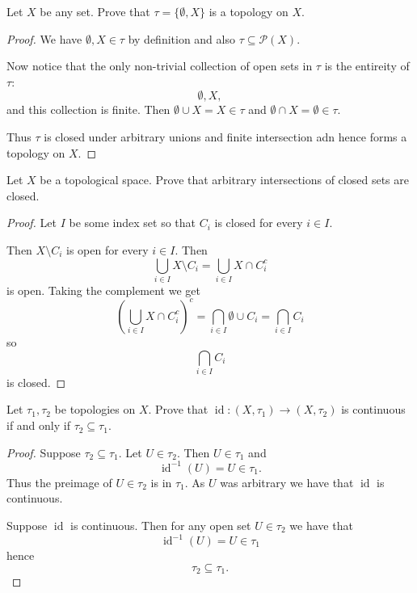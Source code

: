 \documentclass[11pt]{article}
\begin{document}
\begin{prob}
    Let $X$ be any set. Prove that $\tau = \{\emptyset, X\}$ 
    is a topology on $X$. 
\end{prob}
\begin{proof}
    We have $\emptyset, X \in \tau$ by definition and also 
    $\tau \subseteq \mathcal P(X)$. 

    Now notice that the only non-trivial collection 
    of open sets in $\tau$ is the entireity of 
    $\tau$: 
    \[
        \emptyset, X,
    \]
    and this collection is finite. 
    Then $\emptyset \cup X = X \in \tau$ and 
    $\emptyset \cap X = \emptyset \in \tau$. 

    Thus $\tau$ is closed under arbitrary unions 
    and finite intersection adn hence forms a topology 
    on $X$. 
\end{proof}
\begin{prob}
    Let $X$ be a topological space. Prove that arbitrary intersections 
    of closed sets are closed. 
\end{prob}
\begin{proof}
    Let $I$ be some index set so that 
    $C_i$ is closed for every $i \in I$. 

    Then $X \setminus C_i$ is open for every $i \in I$. 
    Then 
    \[
        \bigcup_{i\in I}X \setminus C_i
        = \bigcup_{i\in I} X \cap C_i^c 
    \]
    is open. 
    Taking the complement we get 
    \[
        \left(\bigcup_{i\in I} X \cap C_i^c\right)^c
        = \bigcap_{i\in I} \emptyset \cup C_i 
        = \bigcap_{i \in I} C_i
    \]
    so 
    \[
        \bigcap_{i\in I} C_i  
    \]
    is closed. 
\end{proof}

\begin{prob}
    Let $\tau_1,\tau_2$ be topologies on $X$. Prove that 
    $\operatorname{id} : (X, \tau_1) \to (X, \tau_2)$ is 
    continuous if and only if $\tau_2 \subseteq \tau_1$. 
\end{prob}
\begin{proof}
    Suppose $\tau_2 \subseteq \tau_1$. 
    Let $U \in \tau_2$. Then $U \in \tau_1$ and 
    \[
        \operatorname{id}^{-1}(U) = U \in \tau_1.
    \]
    Thus the preimage of $U \in \tau_2$ is in $\tau_1$. 
    As $U$ was arbitrary we have that $\operatorname{id}$ 
    is continuous. 

    Suppose $\operatorname{id}$ is continuous. Then for any open set 
    $U \in \tau_2$ we have that 
    \[
        \operatorname{id}^{-1}(U) = U \in \tau_1
    \]
    hence 
    \[
        \tau_2 \subseteq \tau_1.
    \]
\end{proof}
\end{document}
